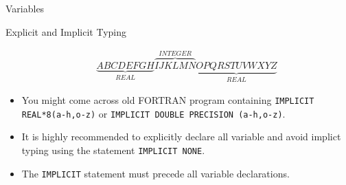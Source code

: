 \documentclass[c,mathserif,compress,xcolor=svgnames]{beamer}
\newcommand{\lstfortran}[1]{\lstinline[language={[90]Fortran},basicstyle=\footnotesize\ttfamily]|#1|}
\newenvironment{eblock}[0]
{
\begin{beamerboxesrounded}[upper=uppercol2,lower=lowercol2,shadow=true]}
{\end{beamerboxesrounded}}
\begin{document}
\begin{frame}[allowframebreaks]{Variables}
\begin{eblock}{Explicit and Implicit Typing}
\begin{itemize}
        \begin{gather*}
          \underbrace{ABCDEFGH}_{REAL}\overbrace{IJKLMN}^{INTEGER}\underbrace{OPQRSTUVWXYZ}_{REAL}
        \end{gather*}
      \item You might come across old FORTRAN program containing \lstfortran{IMPLICIT REAL*8(a-h,o-z)} or \lstfortran{IMPLICIT DOUBLE PRECISION (a-h,o-z)}.
      \item It is highly recommended to explicitly declare all variable and avoid implict typing using the statement \lstfortran{IMPLICIT NONE}.
      \item The \lstfortran{IMPLICIT} statement must precede all variable declarations.
    \end{itemize}
  \end{eblock}
\end{frame}
  
\end{document}
